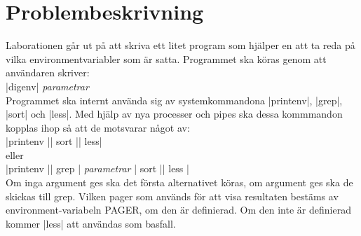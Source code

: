 \documentclass[paper=a4, fontsize=11pt]{scrartcl} %
\numberwithin{equation}{section} %
\numberwithin{figure}{section} %
\numberwithin{table}{section} %
\begin{document}
\section{Problembeskrivning}
Laborationen går ut på att skriva ett litet program som hjälper en att ta reda
på vilka environmentvariabler som är satta.
Programmet ska köras genom att användaren skriver:
\\
|digenv| \emph{parametrar}
\\
Programmet ska internt använda sig av systemkommandona |printenv|, |grep|,
|sort| och |less|.
Med hjälp av nya processer och pipes ska dessa kommmandon kopplas ihop
så att de motsvarar något av:
\\
|printenv |\textbar| sort |\textbar| less| \\ eller \\
|printenv |\textbar| grep | \emph{parametrar} \textbar | sort |\textbar| less |
\\
Om inga argument ges ska det första alternativet köras, om argument ges ska
de skickas till grep.
Vilken pager som används för att visa resultaten bestäms av
environment-variabeln PAGER, om den är definierad.
Om den inte är definierad kommer |less| att användas som basfall.
\end{document}
